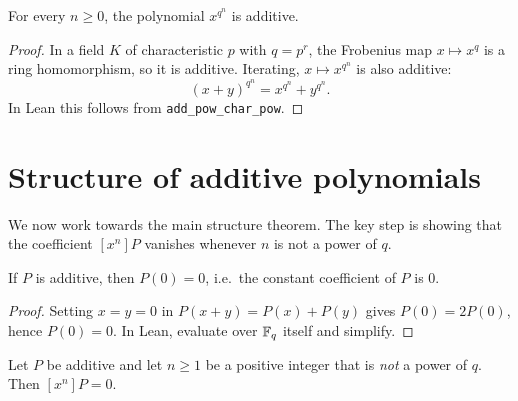 \begin{proposition}
  \label{prop:frobenius_power_additive}
  \leanok
  For every $n \geq 0$, the polynomial $x^{q^n}$ is additive.
\end{proposition}

\begin{proof}
  \leanok
  In a field $K$ of characteristic $p$ with $q = p^r$, the Frobenius map
  $x \mapsto x^q$ is a ring homomorphism, so it is additive.
  Iterating, $x \mapsto x^{q^n}$ is also additive:
  \[
    (x + y)^{q^n} = x^{q^n} + y^{q^n}.
  \]
  In Lean this follows from \texttt{add\_pow\_char\_pow}.
\end{proof}

\section{Structure of additive polynomials}
\label{sec:additive_structure}

We now work towards the main structure theorem.
The key step is showing that the coefficient $[x^n]P$ vanishes whenever
$n$ is not a power of $q$.

\begin{lemma}
  \label{lem:additive_constant_zero}
  \leanok
  If $P$ is additive, then $P(0) = 0$, i.e.\ the constant coefficient of $P$ is $0$.
\end{lemma}

\begin{proof}
  \leanok
  Setting $x = y = 0$ in $P(x+y) = P(x)+P(y)$ gives $P(0) = 2P(0)$,
  hence $P(0) = 0$.
  In Lean, evaluate over $\mathbb{F}_q$ itself and simplify.
\end{proof}

\begin{lemma}
  \label{lem:coeff_zero_not_q_power}
  \leanok
  Let $P$ be additive and let $n \geq 1$ be a positive integer that is
  \emph{not} a power of $q$.  Then $[x^n]P = 0$.
\end{lemma}

